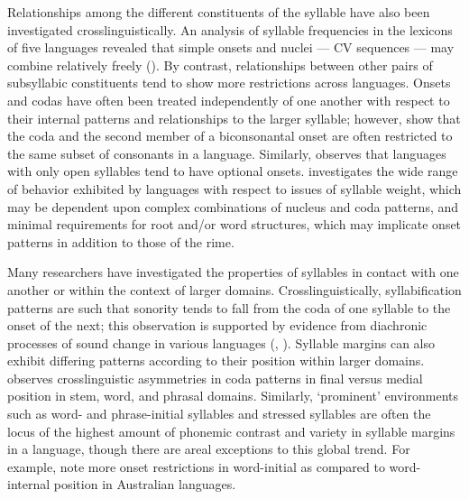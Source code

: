   Relationships among the different constituents of the syllable have also been investigated crosslinguistically. An analysis of syllable frequencies in the lexicons of five languages revealed that simple onsets and nuclei — CV sequences — may combine relatively freely (\citealt{MaddiesonPrecoda1992}). By contrast, relationships between other pairs of subsyllabic constituents tend to show more restrictions across languages. Onsets and codas have often been treated independently of one another with respect to their internal patterns and relationships to the larger syllable; however, \citet{DavisBaertsch2011} show that the coda and the second member of a biconsonantal onset are often restricted to the same subset of consonants in a language. Similarly, \citet{Blevins2006} observes that languages with only open syllables tend to have optional onsets. \citet{Gordon2006} investigates the wide range of behavior exhibited by languages with respect to issues of syllable weight, which may be dependent upon complex combinations of nucleus and coda patterns, and minimal requirements for root and/or word structures, which may implicate onset patterns in addition to those of the rime.



  Many researchers have investigated the properties of syllables in contact with one another or within the context of larger domains. Crosslinguistically, syllabification patterns are such that sonority tends to fall from the coda of one syllable to the onset of the next; this observation is supported by evidence from diachronic processes of sound change in various languages (\citealt{Hooper1976}, \citealt{MurrayVennemann1983}). Syllable margins can also exhibit differing patterns according to their position within larger domains. \citet{Côté2011} observes crosslinguistic asymmetries in coda patterns in final versus medial position in stem, word, and phrasal domains. Similarly, ‘prominent’ environments such as word- and phrase-initial syllables and stressed syllables are often the locus of the highest amount of phonemic contrast and variety in syllable margins in a language, though there are areal exceptions to this global trend. For example, \citet{GasserBowern2014} note more onset restrictions in word-initial as compared to word-internal position in Australian languages.



